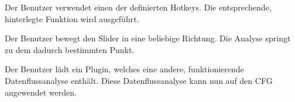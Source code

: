 {Der Benutzer verwendet einen der definierten Hotkeys.}
{Die entsprechende, hinterlegte Funktion wird ausgeführt.}


{Der Benutzer bewegt den Slider in eine beliebige Richtung.}
{Die Analyse springt zu dem dadurch bestimmten Punkt.}


{Der Benutzer lädt ein Plugin, welches eine andere, funktionierende Datenflussanalyse enthält.}
{Diese Datenflussanalyse kann nun auf den CFG angewendet werden.}